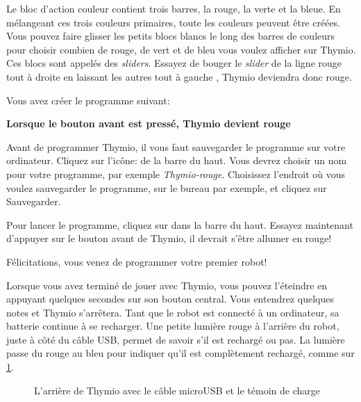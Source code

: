 Le bloc d'action couleur contient trois barres, la rouge, la verte et la bleue. En mélangeant ces trois couleurs primaires, toute les couleurs peuvent être créées. Vous pouvez faire glisser les petits blocs blancs le long des barres de couleurs pour choisir combien de rouge, de vert et de bleu vous voulez afficher sur Thymio. Ces blocs sont appelés des \textit{sliders}. Essayez de bouger le \textit{slider} de la ligne rouge tout à droite en laissant les autres tout à gauche , Thymio deviendra donc rouge.

Vous avez créer le programme suivant:

\begin{center}
	\textbf{Lorsque le bouton avant est pressé, Thymio devient rouge}
\end{center}


Avant de programmer Thymio, il vous faut sauvegarder le programme sur votre ordinateur. Cliquez sur l'icône:  de la barre du haut. Vous devrez choisir un nom pour votre programme, par exemple \textit{Thymio-rouge}. Choisissez l'endroit où vous voulez sauvegarder le programme, sur le bureau par exemple, et cliquez sur Sauvegarder.


Pour lancer le programme, cliquez sur  dans la barre du haut. Essayez maintenant d'appuyer sur le bouton avant de Thymio, il devrait s'être allumer en rouge!

Félicitations, vous venez de programmer votre premier robot!


Lorsque vous avez terminé de jouer avec Thymio, vous pouvez l'éteindre en appuyant quelques secondes sur son bouton central. Vous entendrez quelques notes et Thymio s'arrêtera. Tant que le robot est connecté à un ordinateur, sa batterie continue à se recharger. Une petite lumière rouge à l'arrière du robot, juste à côté du câble USB, permet de savoir s'il est rechargé ou pas. La lumière passe du rouge au bleu pour indiquer qu'il est complètement rechargé, comme sur \cref{fig.back}.

\begin{figure}[h]
\begin{center}
\caption{L'arrière de Thymio avec le câble microUSB et le témoin de charge}\label{fig.back}
\end{center}
\end{figure}

